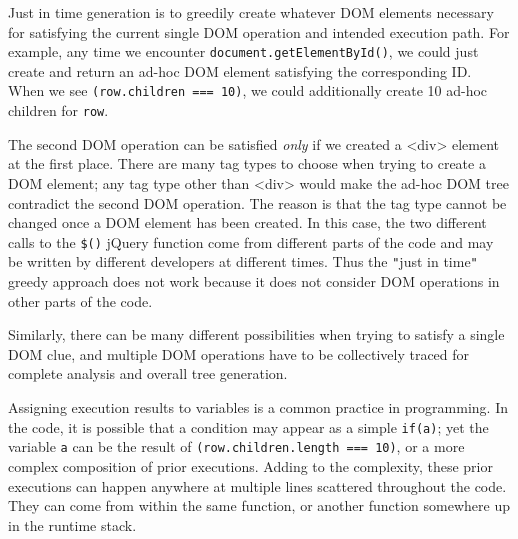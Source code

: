 Just in time generation is to greedily create whatever DOM elements necessary for satisfying the current single DOM operation and intended execution path.    
For example, any time we encounter {\tt document.getElementById()}, we could just create and return an ad-hoc DOM element satisfying the corresponding ID.  
When we see {\tt (row.children === 10)}, we could additionally create 10 ad-hoc children for {\tt row}.  



The second DOM operation can be satisfied {\em only} if we created a <div> element at the first place.  
There are many tag types to choose when trying to create a DOM element; any tag type other than <div> would make the ad-hoc DOM tree contradict the second DOM operation.  
The reason is that the tag type cannot be changed once a DOM element has been created.  
In this case, the two different calls to the {\tt \$()} jQuery function come from different parts of the code and may be written by different developers at different times.  
Thus the {\tt "}just in time{\tt "} greedy approach does not work because it does not consider DOM operations in other parts of the code.  

Similarly, there can be many different possibilities when trying to satisfy a single DOM clue, and multiple DOM operations have to be collectively traced for complete analysis and overall tree generation.   

Assigning execution results to variables is a common practice in programming.  
In the code, it is possible that a condition may appear as a simple {\tt if(a)}; yet the variable {\tt a} can be the result of {\tt (row.children.length === 10)}, or a more complex composition of prior executions. 
Adding to the complexity, these prior executions can happen anywhere at multiple lines scattered throughout the code.  
They can come from within the same function, or another function somewhere up in the runtime stack.

